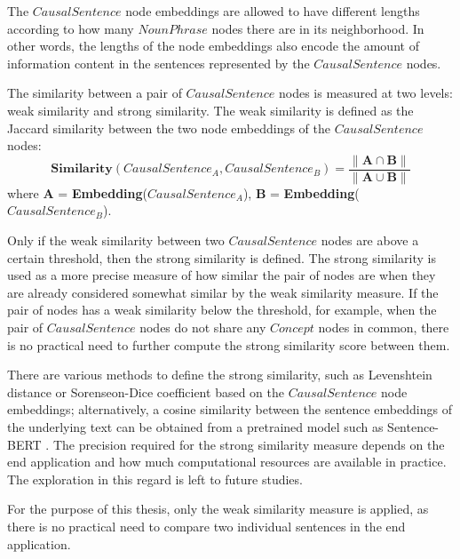 The $CausalSentence$ node embeddings are allowed to have different lengths according to how many $NounPhrase$ nodes there are in its neighborhood. In other words, the lengths of the node embeddings also encode the amount of information content in the sentences represented by the $CausalSentence$ nodes. 

The similarity between a pair of $CausalSentence$ nodes is measured at two levels: weak similarity and strong similarity. The weak similarity is defined as the Jaccard similarity between the two node embeddings of the $CausalSentence$ nodes:
\[ \mathbf{Similarity}(CausalSentence_A, CausalSentence_B) = \frac{\| \mathbf{A \cap B} \|}{\|\mathbf{A \cup B} \|} \]  
where $\mathbf{A}$ = \textbf{Embedding}($CausalSentence_A$), $\mathbf{B}$ = \textbf{Embedding}($CausalSentence_B$).

Only if the weak similarity between two $CausalSentence$ nodes are above a certain threshold, then the strong similarity is defined. The strong similarity is used as a more precise measure of how similar the pair of nodes are when they are already considered somewhat similar by the weak similarity measure. If the pair of nodes has a weak similarity below the threshold, for example, when the pair of $CausalSentence$ nodes do not share any $Concept$ nodes in common, there is no practical need to further compute the strong similarity score between them. 

There are various methods to define the strong similarity, such as Levenshtein distance \cite{similarity2020} or Sorenseon-Dice coefficient \cite{similarity2020} based on the $CausalSentence$ node embeddings; alternatively, a cosine similarity between the sentence embeddings of the underlying text can be obtained from a pretrained model such as Sentence-BERT \cite{sentenceBERT2019}. The precision required for the strong similarity measure depends on the end application and how much computational resources are available in practice. The exploration in this regard is left to future studies. 

For the purpose of this thesis, only the weak similarity measure is applied, as there is no practical need to compare two individual sentences in the end application. 


